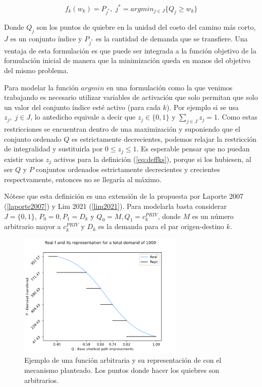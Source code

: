 \documentclass{article}
\begin{document}
  \begin{equation}
    \label{eq:deffks}
    f_k(w_k) = P_{j^*},\; j^* = argmin_{j \in J} \{Q_j \geq w_k\}
  \end{equation}

  Donde $Q_j$ son los puntos de quiebre en la unidad del costo del camino más corto, $J$ es un conjunto índice y $P_{j^*}$ es la cantidad de demanda que se transfiere. Una ventaja de esta formulación es que puede ser integrada a la función objetivo de la formulación inicial de manera que la minimización queda en manos del objetivo del mismo problema.

  Para modelar la función $argmin$ en una formulación como la que venimos trabajando es necesario utilizar variables de activación que solo permitan que solo un valor del conjunto índice esté activo (para cada $k$). Por ejemplo si se usa $z_j,\; j \in J$, lo antedicho equivale a decir que $z_j \in \{0,1\}$ y $\sum_{j \in J} z_j = 1$. Como estas restricciones se encuentran dentro de una maximización y suponiendo que el conjunto ordenado $Q$ es estrictamente decrecientes, podemos relajar la restricción de integralidad y sustituirla por $0 \leq z_j \leq 1$. Es esperable pensar que no puedan existir varios $z_j$ activos para la definición (\ref{eq:deffks}), porque si los hubiesen, al ser $Q$ y $P$ conjuntos ordenados estrictamente decrecientes y crecientes respectvamente, entonces no se llegaría al máximo.

  Nótese que esta definición es una extensión de la propuesta por Laporte 2007 (\ref{laporte2007}) y Lim 2021 (\ref{lim2021}). Para modelarla basta considerar $J = \{0, 1\}$, $P_0 = 0, P_1 = D_k$ y $Q_0 = M, Q_1 = c^{PRIV}_k$, donde $M$ es un número arbitrario mayor a $c^{PRIV}_k$ y $D_k$ es la demanda para el par origen-destino $k$.

  \begin{figure}[h!]
    \centering
    \includegraphics[width=8cm]{../resources/f_example.png}
    \caption{Ejemplo de una función arbitraria y su representación de con el mecanismo planteado. Los puntos donde hacer los quiebres son arbitrarios.}
    \label{fig:fdrawexample}
  \end{figure}
\end{document}
